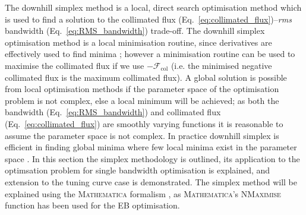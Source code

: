 \documentclass[../main.tex]{subfiles}
\begin{document}
The downhill simplex method is a local, direct search optimisation method which is used to find a solution to the collimated flux (Eq.~\ref{eq:collimated_flux})--\textit{rms} bandwidth (Eq.~\ref{eq:RMS_bandwidth}) trade-off. The downhill simplex optimisation method is a local minimisation routine, since derivatives are effectively used to find minima \cite{jones2016design}; however a minimisation routine can be used to maximise the collimated flux if we use $-\mathcal{F}_{\mathrm{col}}$ (i.e. the minimised negative collimated flux is the maximum collimated flux). A global solution is possible from local optimisation methods if the parameter space of the optimisation problem is not complex, else a local minimum will be achieved; as both the bandwidth (Eq.~\ref{eq:RMS_bandwidth}) and collimated flux (Eq.~\ref{eq:collimated_flux}) are smoothly varying functions it is reasonable to assume the parameter space is not complex. In practice downhill simplex is efficient in finding global minima where few local minima exist in the parameter space \cite{wolfram2021nmaximize}. In this section the simplex methodology is outlined, its application to the optimsation problem for single bandwidth optimisation is explained, and extension to the tuning curve case is demonstrated. The simplex method will be explained using the \textsc{Mathematica} formalism \cite{wolfram2021nmaximize}, as \textsc{Mathematica}'s \textsc{NMaximise} function has been used for the EB optimisation.
\end{document}
